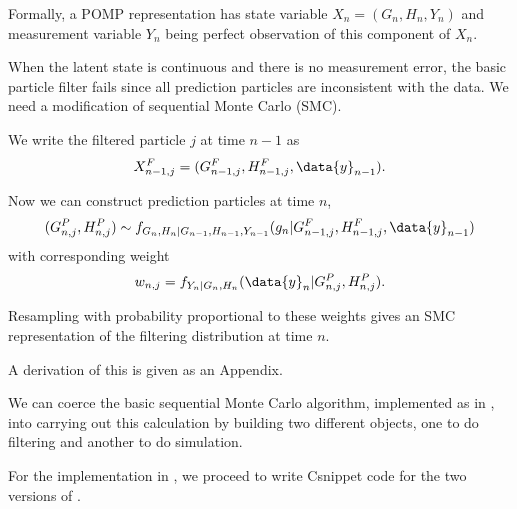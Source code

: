 \begin{frame}
\bi
\item Formally, a POMP representation has state variable $X_n=(G_{n},H_{n},Y_{n})$ and measurement variable $Y_n$ being perfect observation of this component of $X_n$. 

\item When the latent state is continuous and there is no measurement error, the basic particle filter fails since all prediction particles are inconsistent with the data. We need a modification of sequential Monte Carlo (SMC).

\item We write the filtered particle $j$ at time $n-1$ as 
$$ X^F_{n-1,j}=(G^F_{n-1,j},H^F_{n-1,j},\data{y}_{n-1}).$$

\item Now we can construct prediction particles at time $n$,
$$(G^P_{n,j},H^P_{n,j})\sim f_{G_{n},H_n|G_{n-1},H_{n-1},Y_{n-1}}(g_n|G^F_{n-1,j},H^F_{n-1,j},\data{y}_{n-1})$$
with corresponding weight 
$$w_{n,j}=f_{Y_n|G_n,H_n}(\data{y}_n|G^P_{n,j},H^P_{n,j}).$$

\item Resampling with probability proportional to these weights gives an SMC representation of the filtering distribution at time $n$.

\item A derivation of this is given as an Appendix. 


\ei


\end{frame}

\begin{frame}[fragile]

\bi

\item We can coerce the basic sequential Monte Carlo algorithm, implemented as  in , into carrying out this calculation by building two different  objects, one to do filtering and another to do simulation.

\item For the implementation in , we proceed to write Csnippet code for the two versions of . 

\ei

\begin{knitrout}\small
{}\color{fgcolor}\begin{kframe}
\begin{alltt}
 \hlkwb{<-} \hldef{(}\hldef{,}\hldef{,}\hldef{)}
 \hlkwb{<-} \hldef{(}\hldef{,}\hldef{,}\hldef{,}\hldef{)}
 \hlkwb{<-} \hldef{(}\hldef{,}\hldef{)}
 \hlkwb{<-} 
\end{alltt}
\end{kframe}
\end{knitrout}


\end{frame}

